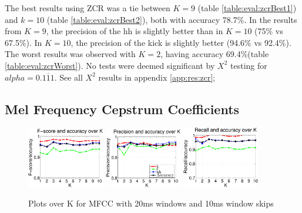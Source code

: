 		The best results using ZCR was a tie between $K=9$ (table \ref{table:eval:zcrBest1}) and $k=10$ (table \ref{table:eval:zcrBest2}), both with accuracy 78.7\%. In the results from $K=9$, the precision of the hh is slightly better than in $K=10$ (75\% vs 67.5\%). In $K=10$, the precision of the kick is slightly better (94.6\% vs 92.4\%). The worst results was observed with $K=2$, having accuracy 69.4\%(table \ref{table:eval:zcrWorst}). No tests were deemed significant by $X^2$ testing for $alpha=0.\overline{111}$. See all $X^2$ results in appendix \ref{app:res:zcr};
		
		
	\subsection{Mel Frequency Cepstrum Coefficients}
		\begin{figure}
			\centering\includegraphics[width=0.3\textwidth]{tex/appendices/test/mfcc2010FP.png}
			\centering\includegraphics[width=0.3\textwidth]{tex/appendices/test/mfcc2010_P.png}
			\centering\includegraphics[width=0.3\textwidth]{tex/appendices/test/mfcc2010_R.png}
			
			\caption{Plots over K for MFCC with 20ms windows and 10ms window skips}
		\end{figure}
